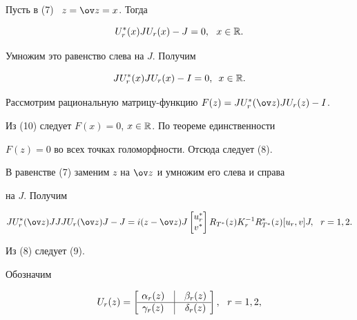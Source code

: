 \begin{pf}


Пусть в (7) \ $z=\ov z=x$. Тогда


$$


U_r^*(x)JU_r(x)-J=0, \ \ x \in {\Bbb R}.


$$


Умножим это равенство слева на $J$. Получим


\begin{equation}


JU_r^*(x)JU_r(x)-I=0, \ \, x \in {\Bbb R}.


\end{equation}


Рассмотрим рациональную матрицу-функцию $F(z)=JU_r^*(\ov z)JU_r(z)-I$.


Из (10) следует $F(x)=0$, $x \in {\Bbb R}$. По теореме единственности


$F(z)=0$ во всех точках голоморфности. Отсюда следует (8).


В равенстве (7) заменим $z$ на $\ov z$ и умножим его слева и справа


на $J$. Получим


$$


JU_r^*(\ov z)JJJU_r(\ov z)J-J=


i(z-\ov z)J \begin{bmatrix} u_r^* \\ v^* \end{bmatrix}


R_{T^*}(z)K_r^{-1} R_{T^*}^*(z)[u_r, v]J,\ \ r=1,2.


$$


Из (8) следует (9).


\end{pf}





Обозначим


\begin{equation}


U_r(z) = \left[\ \begin{matrix}


\alpha_r (z) & \vline & \beta_r (z) \\


\hline


\gamma_r (z) & \vline & \delta_r (z)


\end{matrix}\ \right], \ \ r=1,2,


\end{equation}


